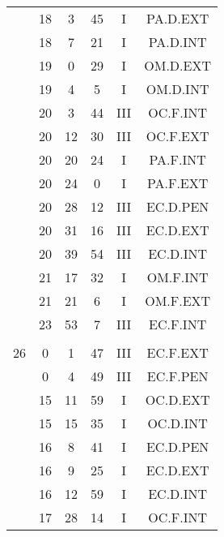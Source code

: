 \documentclass[12pt, a4paper]{article}
\begin{document}
\begin{multicols}{3}
{\begin{tabular}{c c c c c c}
	 	 	 	 & 18 & 3 & 45 & I & PA.D.EXT\\%
	 	 	 	 & 18 & 7 & 21 & I & PA.D.INT\\%
	 	 	 	 & 19 & 0 & 29 & I & OM.D.EXT\\%
	 	 	 	 & 19 & 4 & 5 & I & OM.D.INT\\%
	 	 	 	 & 20 & 3 & 44 & III & OC.F.INT\\%
	 	 	 	 & 20 & 12 & 30 & III & OC.F.EXT\\%
	 	 	 	 & 20 & 20 & 24 & I & PA.F.INT\\%
	 	 	 	 & 20 & 24 & 0 & I & PA.F.EXT\\%
	 	 	 	 & 20 & 28 & 12 & III & EC.D.PEN\\%
	 	 	 	 & 20 & 31 & 16 & III & EC.D.EXT\\%
	 	 	 	 & 20 & 39 & 54 & III & EC.D.INT\\%
	 	 	 	 & 21 & 17 & 32 & I & OM.F.INT\\%
	 	 	 	 & 21 & 21 & 6 & I & OM.F.EXT\\%
	 	 	 	 & 23 & 53 & 7 & III & EC.F.INT\\%
	 	 	 	 & & & & & \\%
	 	 	 	26 & 0 & 1 & 47 & III & EC.F.EXT\\%
	 	 	 	 & 0 & 4 & 49 & III & EC.F.PEN\\%
	 	 	 	 & 15 & 11 & 59 & I & OC.D.EXT\\%
	 	 	 	 & 15 & 15 & 35 & I & OC.D.INT\\%
	 	 	 	 & 16 & 8 & 41 & I & EC.D.PEN\\%
	 	 	 	 & 16 & 9 & 25 & I & EC.D.EXT\\%
	 	 	 	 & 16 & 12 & 59 & I & EC.D.INT\\%
	 	 	 	 & 17 & 28 & 14 & I & OC.F.INT\\%

\end{tabular}}
\end{multicols}
\end{document}
